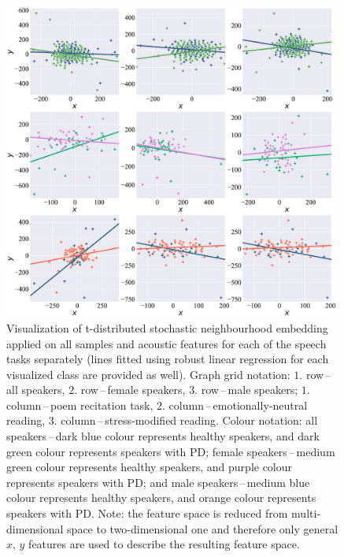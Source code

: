 \begin{figure}[htb!]
	\centering
	\scriptsize
	\includegraphics[width=0.99\textwidth]{pictures/ch4_tsne_separated.eps}
	\caption[t-distributed stochastic neighbourhood embedding visualization.]{Visualization of t-distributed stochastic neighbourhood embedding applied on all samples and acoustic features for each of the speech tasks separately (lines fitted using robust linear regression for each visualized class are provided as well). Graph grid notation: $1$. row\,--\,all speakers, $2$. row\,--\,female speakers, $3$. row\,--\,male speakers; $1$. column\,--\,poem recitation task, $2$. column\,--\,emotionally-neutral reading, $3$. column\,--\,stress-modified reading. Colour notation: all speakers\,--\,dark blue colour represents healthy speakers, and dark green colour represents speakers with PD; female speakers\,--\,medium green colour represents healthy speakers, and purple colour represents speakers with PD; and male speakers\,--\,medium blue colour represents healthy speakers, and orange colour represents speakers with PD. Note: the feature space is reduced from multi-dimensional space to two-dimensional one and therefore only general $x$, $y$ features are used to describe the resulting feature space.}
	\label{fig:ch4_tsne}
\end{figure}

